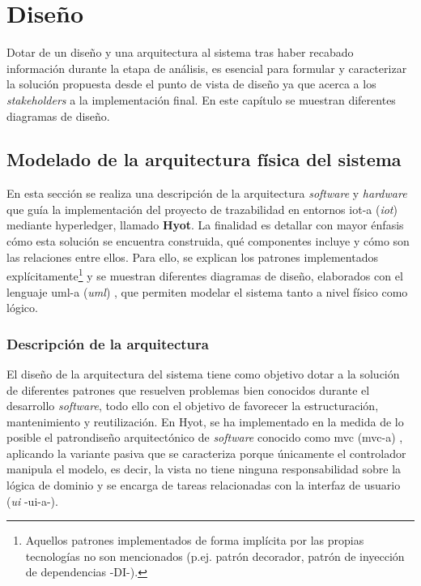 \documentclass[12pt,a4paper, twoside]{report}
\begin{document}
	\chapter{Diseño} \label{designChapter}
	
	Dotar de un diseño y una arquitectura al sistema tras haber recabado información durante la etapa de análisis, es esencial para formular y caracterizar la solución propuesta desde el punto de vista de diseño ya que acerca a los \textit{\glspl{stakeholder}} a la implementación final. En este capítulo se muestran diferentes diagramas de diseño.
	
	\section{Modelado de la arquitectura física del sistema}
	
	En esta sección se realiza una descripción de la arquitectura \textit{software} y \textit{hardware} que guía la implementación del proyecto de trazabilidad en entornos \gls{iot-a} (\textit{\gls{iot}}) mediante \gls{hyperledger}, llamado \textbf{Hyot}. La finalidad es detallar con mayor énfasis cómo esta solución se encuentra construida, qué componentes incluye y cómo son las relaciones entre ellos. Para ello, se explican los patrones implementados explícitamente\footnote{Aquellos patrones implementados de forma implícita por las propias tecnologías no son mencionados (p.ej. patrón decorador, patrón de inyección de dependencias -DI-).} y se muestran diferentes diagramas de diseño, elaborados con el lenguaje \gls{uml-a} (\textit{\gls{uml}}) \cite{uml}, que permiten modelar el sistema tanto a nivel físico como lógico.
		
	\subsection{Descripción de la arquitectura}\label{architectureDescription}
	
	El diseño de la arquitectura del sistema tiene como objetivo dotar a la solución de diferentes patrones que resuelven problemas bien conocidos durante el desarrollo \textit{software}, todo ello con el objetivo de favorecer la estructuración, mantenimiento y reutilización. En Hyot, se ha implementado en la medida de lo posible el \gls{patrondiseño} arquitectónico de \textit{software} conocido como \gls{mvc} (\gls{mvc-a}) \cite{buschmann:mvc}, aplicando la variante pasiva que se caracteriza porque únicamente el controlador manipula el modelo, es decir, la vista no tiene ninguna responsabilidad sobre la lógica de dominio y se encarga de tareas relacionadas con la interfaz de usuario (\textit{\gls{ui}} -\gls{ui-a}-). \\
	
\end{document}
